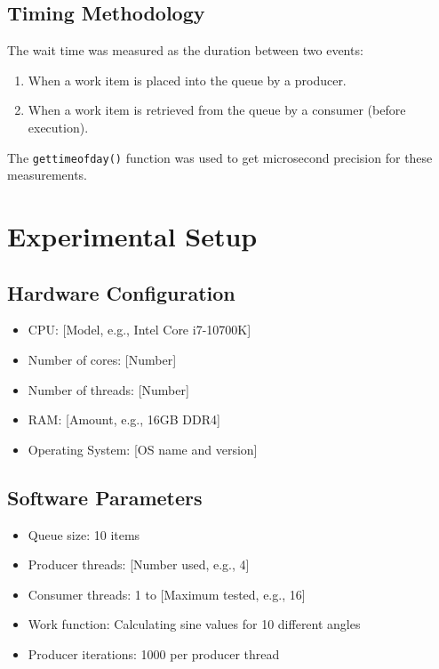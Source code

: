 \documentclass[12pt,a4paper]{article}
\begin{document}
\subsection{Timing Methodology}

The wait time was measured as the duration between two events:
\begin{enumerate}
  \item When a work item is placed into the queue by a producer.
  \item When a work item is retrieved from the queue by a consumer (before execution).
\end{enumerate}

The \texttt{gettimeofday()} function was used to get microsecond precision for these measurements.

\section{Experimental Setup}

\subsection{Hardware Configuration}
\begin{itemize}
  \item CPU: [Model, e.g., Intel Core i7-10700K]
  \item Number of cores: [Number]
  \item Number of threads: [Number]
  \item RAM: [Amount, e.g., 16GB DDR4]
  \item Operating System: [OS name and version]
\end{itemize}

\subsection{Software Parameters}
\begin{itemize}
  \item Queue size: 10 items
  \item Producer threads: [Number used, e.g., 4]
  \item Consumer threads: 1 to [Maximum tested, e.g., 16]
  \item Work function: Calculating sine values for 10 different angles
  \item Producer iterations: 1000 per producer thread
\end{itemize}
\end{document}
